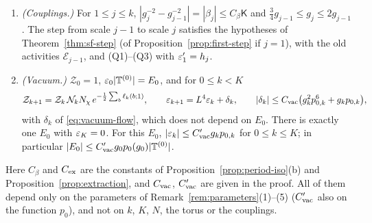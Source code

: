 \begin{theorem}
\begin{enumerate}[label=(\alph*)]
\[
\Big|\sum_{X\in\cX^{\rm sm}_j(\Box)}E^{(j)}(X,U)-\beta_jS_\Box(U)\Big|\le
\begin{cases}C_{\rm ex}\mathsf K\,L^{-\alpha m},&m\ge m_0,\\ C_{\rm ex}\mathsf K,&m<m_0,\end{cases}
\]
the other polymers satisfy the bound of Lemma~\ref{lem:large-later}(a), and the old activities that of Proposition~\ref{prop:old-activities}(b). For every $V\in\mathfrak U_k(h_k)$,
\[
\begin{aligned}
&\Big|\sum_{j=1}^k\big(E^{(j)}-\beta_jS\big)\big(U_k(V)\big)\Big|\le C_{\rm lat}\mathsf K\,|\T^{(k)}|,\\
&C_{\rm lat}=M^{-4}\Big(C_{\rm ex}\Big(m_0+\frac1{1-L^{-\alpha}}\Big)+2K_0L^{5m_0}\Big).
\end{aligned}
\]
\item \emph{(Couplings.)} For $1\le j\le k$, $|g_j^{-2}-g_{j-1}^{-2}|=|\beta_j|\le C_\beta\mathsf K$ and $\frac34g_{j-1}\le g_j\le2g_{j-1}$. The step from scale $j-1$ to scale $j$ satisfies the hypotheses of Theorem~\ref{thm:sf-step} (of Proposition~\ref{prop:first-step} if $j=1$), with the old activities $\mathcal E_{j-1}$, and (Q1)--(Q3) with $\varepsilon'_1=h_j$.
\item \emph{(Vacuum.)} $\mathcal Z_0=1$, $\varepsilon_0|\mathbb T^{(0)}|=E_0$, and for $0\le k<K$
\[
\mathcal Z_{k+1}=\mathcal Z_k\,\mathcal N_kN_\chi\,e^{-\frac12\sum_b\ell_k(b;1)},\qquad\varepsilon_{k+1}=L^4\varepsilon_k+\delta_k,\qquad|\delta_k|\le C_{\rm vac}\big(g_k^2p_{0,k}^6+g_kp_{0,k}\big),
\]
with $\delta_k$ of \eqref{eq:vacuum-flow}, which does not depend on $E_0$. There is exactly one $E_0$ with $\varepsilon_K=0$. For this $E_0$, $|\varepsilon_k|\le C'_{\rm vac}g_kp_{0,k}$ for $0\le k\le K$; in particular $|E_0|\le C'_{\rm vac}g_0p_0(g_0)|\mathbb T^{(0)}|$.
\end{enumerate}
Here $C_\beta$ and $C_{\rm ex}$ are the constants of Proposition~\ref{prop:period-iso}(b) and Proposition~\ref{prop:extraction}, and $C_{\rm vac}$, $C'_{\rm vac}$ are given in the proof. All of them depend only on the parameters of Remark~\ref{rem:parameters}(1)--(5) ($C'_{\rm vac}$ also on the function $p_0$), and not on $k$, $K$, $N$, the torus or the couplings.
\end{theorem}

